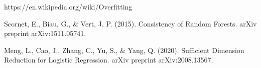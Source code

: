 
\begin{thebibliography}{99}






















	 https://en.wikipedia.org/wiki/Overfitting

	 Scornet, E., Biau, G., \& Vert, J. P. (2015). Consistency of Random Forests. arXiv preprint arXiv:1511.05741.

	 Meng, L., Cao, J., Zhang, C., Yu, S., \& Yang, Q. (2020). Sufficient Dimension Reduction for Logistic Regression. arXiv preprint arXiv:2008.13567.


\end{thebibliography}
